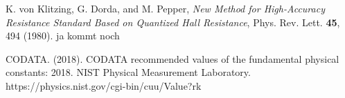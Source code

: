 \begin{thebibliography}{99}
     K. von Klitzing, G. Dorda, and M. Pepper, \emph{New Method for High-Accuracy
    Resistance Standard Based on Quantized Hall Resistance}, Phys. Rev. Lett. \textbf{45}, 494 (1980).
     ja kommt noch

    CODATA. (2018). CODATA recommended values of the fundamental physical constants: 
    2018. NIST Physical Measurement Laboratory.
    https://physics.nist.gov/cgi-bin/cuu/Value?rk



\end{thebibliography}



